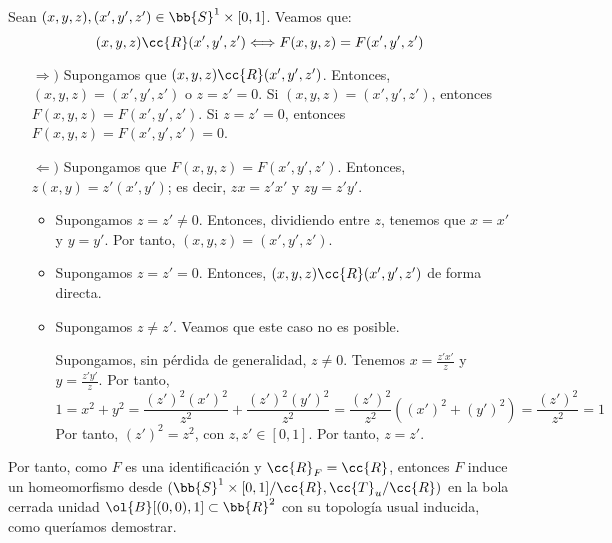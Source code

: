 \documentclass[12pt]{article}
\newcommand{\T}[0]{\cc{T}}
\begin{document}
\begin{ejercicio}[5 puntos]
        Sean $(x,y,z),(x',y',z')\in \bb{S}^1\times [0,1]$. Veamos que:
        \begin{equation*}
            (x,y,z)\cc{R}(x',y',z')\Longleftrightarrow F(x,y,z)=F(x',y',z')
        \end{equation*}
        \begin{itemize}
            \item[$\Longrightarrow)$] Supongamos que $(x,y,z)\cc{R}(x',y',z')$. Entonces, $(x,y,z)=(x',y',z')$ o $z=z'=0$. Si $(x,y,z)=(x',y',z')$, entonces $F(x,y,z)=F(x',y',z')$.
            Si $z=z'=0$, entonces $F(x,y,z)=F(x',y',z')=0$.

            \item[$\Longleftarrow)$] Supongamos que $F(x,y,z)=F(x',y',z')$. Entonces, $z(x,y)=z'(x',y')$; es decir, $zx=z'x'$ y $zy=z'y'$.
            \begin{itemize}
                \item Supongamos $z=z'\neq 0$. Entonces, dividiendo entre $z$, tenemos que $x=x'$ y $y=y'$. Por tanto, $(x,y,z)=(x',y',z')$.
                \item Supongamos $z=z'=0$. Entonces, $(x,y,z)\cc{R}(x',y',z')$ de forma directa.
                \item Supongamos $z\neq z'$. Veamos que este caso no es posible.
                
                Supongamos, sin pérdida de generalidad, $z\neq 0$. Tenemos $x=\frac{z'x'}{z}$ y $y=\frac{z'y'}{z}$. Por tanto,
                    $$1 = x^2+y^2 = \frac{(z')^2(x')^2}{z^2} + \frac{(z')^2(y')^2}{z^2} = \frac{(z')^2}{z^2}((x')^2+(y')^2) = \frac{(z')^2}{z^2} = 1$$
                    Por tanto, $(z')^2=z^2$, con $z,z'\in [0,1]$. Por tanto, $z=z'$.
            \end{itemize}
        \end{itemize}

        Por tanto, como $F$ es una identificación y $\cc{R}_F = \cc{R}$, entonces $F$ induce un homeomorfismo desde
        $(\bb{S}^1\times [0,1]/\cc{R},\T_u/\cc{R})$ en la bola cerrada unidad $\ol{B}[(0,0), 1]\subset \bb{R}^2$ con su topología usual inducida,
        como queríamos demostrar.
    \end{ejercicio}
\end{document}
